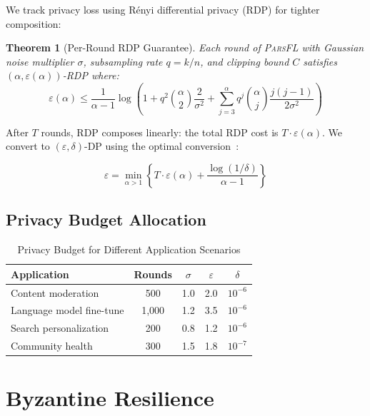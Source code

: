 \documentclass[11pt,a4paper]{article}
\newcommand{\parsfl}{\textsc{ParsFL}\xspace}
\newtheorem{theorem}{Theorem}
\begin{document}
We track privacy loss using R\'enyi differential privacy (RDP) for tighter composition:

\begin{theorem}[Per-Round RDP Guarantee]
Each round of \parsfl with Gaussian noise multiplier $\sigma$, subsampling rate $q = k/n$, and clipping bound $C$ satisfies $(\alpha, \varepsilon(\alpha))$-RDP where:
\begin{equation}
    \varepsilon(\alpha) \leq \frac{1}{\alpha - 1} \log\left(1 + q^2 \binom{\alpha}{2} \frac{2}{\sigma^2} + \sum_{j=3}^{\alpha} q^j \binom{\alpha}{j} \frac{j(j-1)}{2\sigma^2}\right)
\end{equation}
\end{theorem}

After $T$ rounds, RDP composes linearly: the total RDP cost is $T \cdot \varepsilon(\alpha)$. We convert to $(\varepsilon, \delta)$-DP using the optimal conversion~\citep{balle2020hypothesis}:

\begin{equation}
    \varepsilon = \min_{\alpha > 1} \left\{ T \cdot \varepsilon(\alpha) + \frac{\log(1/\delta)}{\alpha - 1} \right\}
\end{equation}

\subsection{Privacy Budget Allocation}

\begin{table}[H]
\centering
\caption{Privacy Budget for Different Application Scenarios}
\label{tab:privacy-budget}
\begin{tabular}{lcccc}
\toprule
\textbf{Application} & \textbf{Rounds} & $\sigma$ & $\varepsilon$ & $\delta$ \\
\midrule
Content moderation & 500 & 1.0 & 2.0 & $10^{-6}$ \\
Language model fine-tune & 1{,}000 & 1.2 & 3.5 & $10^{-6}$ \\
Search personalization & 200 & 0.8 & 1.2 & $10^{-6}$ \\
Community health & 300 & 1.5 & 1.8 & $10^{-7}$ \\
\bottomrule
\end{tabular}
\end{table}

\section{Byzantine Resilience}
\end{document}
